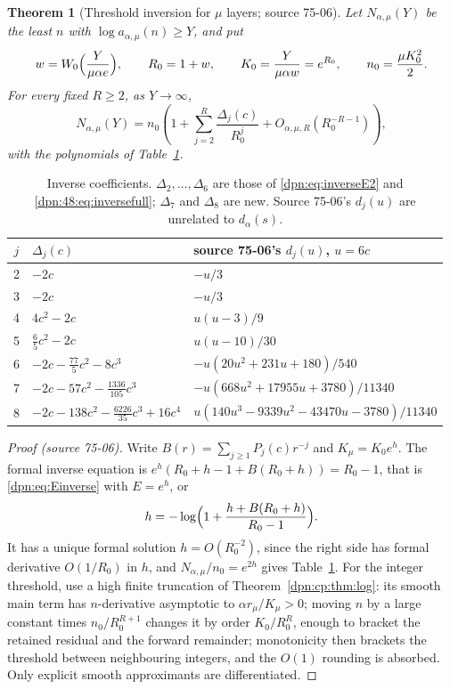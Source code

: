 \documentclass[11pt]{article}
\numberwithin{equation}{section}
\newtheorem{theorem}{Theorem}[section]
\theoremstyle{definition}\newtheorem{definition}[theorem]{Definition}
\theoremstyle{remark}\newtheorem{remark}[theorem]{Remark}
\newcommand{\src}[1]{\textup{(source #1)}}
\begin{document}
\begin{theorem}[Threshold inversion for $\mu$ layers; source 75-06]\label{dpn:cp:thm:inverse}
Let $N_{\alpha,\mu}(Y)$ be the least $n$ with $\log a_{\alpha,\mu}(n)\ge Y$, and put
\[
 w=W_0\Bigl(\frac{Y}{\mu\alpha e}\Bigr),\qquad R_0=1+w,\qquad
 K_0=\frac{Y}{\mu\alpha w}=e^{R_0},\qquad n_0=\frac{\mu K_0^2}2 .
\]
For every fixed $R\ge2$, as $Y\to\infty$,
\begin{equation}\label{dpn:cp:eq:inverse}
 N_{\alpha,\mu}(Y)=n_0\left(1+\sum_{j=2}^R\frac{\Delta_j(c)}{R_0^j}
 +O_{\alpha,\mu,R}(R_0^{-R-1})\right),
\end{equation}
with the polynomials of Table~\ref{dpn:cp:tab:inverse}.
\end{theorem}
\begin{table}[!htbp]
\centering\small
\renewcommand{\arraystretch}{1.3}
\begin{tabular}{cll}
\toprule
$j$ & $\Delta_j(c)$ & source 75-06's $d_j(u)$, $u=6c$\\
\midrule
2 & $-2c$ & $-u/3$\\
3 & $-2c$ & $-u/3$\\
4 & $4c^2-2c$ & $u(u-3)/9$\\
5 & $\tfrac65c^2-2c$ & $u(u-10)/30$\\
6 & $-2c-\tfrac{77}5c^2-8c^3$ & $-u(20u^2+231u+180)/540$\\
7 & $-2c-57c^2-\tfrac{1336}{105}c^3$ & $-u(668u^2+17955u+3780)/11340$\\
8 & $-2c-138c^2-\tfrac{6226}{35}c^3+16c^4$ & $u(140u^3-9339u^2-43470u-3780)/11340$\\
\bottomrule
\end{tabular}
\caption{Inverse coefficients.  $\Delta_2,\dots,\Delta_6$ are those of
\eqref{dpn:eq:inverseE2} and \eqref{dpn:48:eq:inversefull}; $\Delta_7$ and
$\Delta_8$ are new.  Source 75-06's $d_j(u)$ are unrelated to $d_\alpha(s)$.}
\label{dpn:cp:tab:inverse}
\end{table}
\begin{proof}[Proof \src{75-06}]
Write $B(r)=\sum_{j\ge1}P_j(c)r^{-j}$ and $K_\mu=K_0e^h$.  The formal inverse
equation is $e^h(R_0+h-1+B(R_0+h))=R_0-1$, that is
\eqref{dpn:eq:Einverse} with $E=e^h$, or
\[
 h=-\log\Bigl(1+\frac{h+B(R_0+h)}{R_0-1}\Bigr).
\]
It has a unique formal solution $h=O(R_0^{-2})$, since the right side has
formal derivative $O(1/R_0)$ in $h$, and $N_{\alpha,\mu}/n_0=e^{2h}$ gives
Table~\ref{dpn:cp:tab:inverse}.  For the integer threshold, use a high finite
truncation of Theorem~\ref{dpn:cp:thm:log}: its smooth main term has
$n$-derivative asymptotic to $\alpha r_\mu/K_\mu>0$; moving $n$ by a large
constant times $n_0/R_0^{R+1}$ changes it by order $K_0/R_0^R$, enough to
bracket the retained residual and the forward remainder; monotonicity then
brackets the threshold between neighbouring integers, and the $O(1)$ rounding
is absorbed.  Only explicit smooth approximants are differentiated.
\end{proof}
\end{document}
